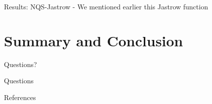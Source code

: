 \documentclass[10pt]{beamer}
\begin{document}
\begin{frame}[fragile]{Results: NQS-Jastrow}
    - We mentioned earlier this Jastrow function
\end{frame}

\section{Summary and Conclusion}

{
\begin{frame}[standout]
  Questions?
\end{frame}
}

\appendix

\begin{frame}[fragile]{Questions}
\end{frame}

\begin{frame}[allowframebreaks]{References}

  
  

\end{frame}
\end{document}
